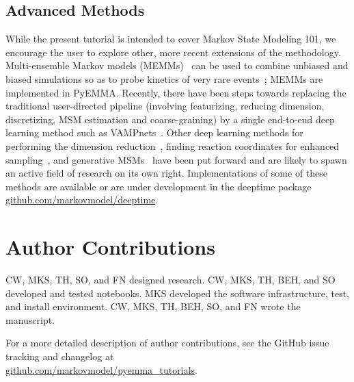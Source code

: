 \documentclass[9pt,tutorial]{livecoms}
\newcommand{\githubrepository}{\url{github.com/markovmodel/pyemma_tutorials}}
\begin{document}
\subsection{Advanced Methods}

While the present tutorial is intended to cover Markov State Modeling 101, we encourage the user to explore other, more recent extensions of the methodology.
Multi-ensemble Markov models (MEMMs)~\cite{dtram,tram} can be used to combine unbiased and biased simulations so as to probe kinetics of very rare events~\cite{trammbar}; MEMMs are implemented in PyEMMA.
Recently, there have been steps towards replacing the traditional user-directed pipeline (involving featurizing, reducing dimension, discretizing, MSM estimation and coarse-graining) by a single end-to-end deep learning method such as VAMPnets~\cite{vampnet}.
Other deep learning methods for performing the dimension reduction~\cite{tae}, finding reaction coordinates for enhanced sampling~\cite{hernandez-vde,Sultan2018-vde-enhanced-sampling,Ribeiro2018-rave}, and generative MSMs~\cite{deep-gen-msm-preprint} have been put forward and are likely to spawn an active field of research on its own right.
Implementations of some of these methods are available or are under development in the deeptime package \url{github.com/markovmodel/deeptime}. 

\section{Author Contributions}
%
CW, MKS, TH, SO, and FN designed research.
CW, MKS, TH, BEH, and SO developed and tested notebooks.
MKS developed the software infrastructure, test, and install environment.
CW, MKS, TH, BEH, SO, and FN wrote the manuscript.

For a more detailed description of author contributions, see the GitHub issue tracking and changelog at\\\githubrepository{}.
\end{document}
